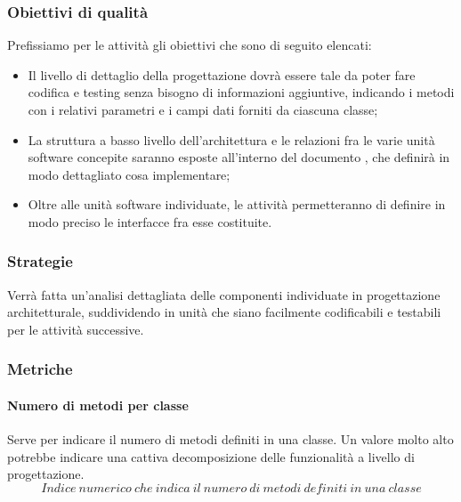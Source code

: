 \documentclass[../PianoDiQualifica.tex]{subfiles}
\begin{document}
			\subsubsection{Obiettivi di qualità}
			Prefissiamo per le attività gli obiettivi che sono di seguito elencati:
			\begin{itemize}
				\item Il livello di dettaglio della progettazione dovrà essere tale da poter fare codifica e testing senza bisogno di informazioni aggiuntive, indicando i metodi con i relativi parametri e i campi dati forniti da ciascuna classe;
				\item La struttura a basso livello dell'architettura e le relazioni fra le varie unità software concepite saranno esposte all'interno del documento , che definirà in modo dettagliato cosa implementare;
				\item Oltre alle unità software individuate, le attività permetteranno di definire in modo preciso le interfacce fra esse costituite.
			\end{itemize}
			
			\subsubsection{Strategie}
			Verrà fatta un'analisi dettagliata delle componenti individuate in progettazione architetturale, suddividendo in unità che siano facilmente codificabili e testabili per le attività successive.
			
			\subsubsection{Metriche}
			\paragraph{Numero di metodi per classe}
			Serve per indicare il numero di metodi definiti in una classe. Un valore molto alto potrebbe indicare una cattiva decomposizione delle funzionalità a livello di progettazione.
			\begin{equation*}
					Indice \ numerico \ che \ indica \ il \ numero \ di \ metodi \ definiti \ in \ una \ classe
				\end{equation*}
			
\end{document}
